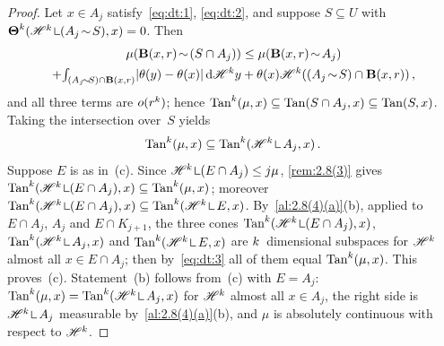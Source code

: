 \begin{proof}
    Let $x \in A_j$ satisfy~\eqref{eq:dt:1}, \eqref{eq:dt:2}, and suppose $S \subseteq U$ with
    $\density^{\vdim}(\HM^{\vdim} \restrict (A_j \without S), x) = 0$. Then
    \begin{multline*}
        \mu(\cball{x}{r} \without (S \cap A_j)) \le \mu(\cball{x}{r} \without A_j) \\
        + \textint{(A_j \without S) \cap \cball{x}{r}}{} |\theta(y) - \theta(x)| \ud \HM^{\vdim} y
        + \theta(x) \HM^{\vdim}((A_j \without S) \cap \cball{x}{r}) \,,
    \end{multline*}
    and all three terms are $o(r^{k})$; hence $\operatorname{Tan}^{k}(\mu,x) \subseteq \operatorname{Tan}(S \cap
    A_j, x) \subseteq \operatorname{Tan}(S,x)$. Taking the intersection over~$S$ yields
    \begin{equation}
        \label{eq:dt:3}
        \Tan^{\vdim}(\mu,x) \subseteq \Tan^{\vdim}(\HM^{\vdim} \restrict A_j, x) \,.
    \end{equation}
    Suppose $E$ is as in~(c). Since $\HM^{\vdim} \restrict (E \cap A_j) \le j \mu$,
    \ref{rem:2.8(3)} gives $\Tan^{\vdim}(\HM^{\vdim} \restrict (E \cap A_j), x) \subseteq
    \Tan^{\vdim}(\mu,x)$; moreover $\Tan^{\vdim}(\HM^{\vdim} \restrict (E \cap A_j), x) \subseteq
    \Tan^{\vdim}(\HM^{\vdim} \restrict E, x)$. By~\ref{al:2.8(4)(a)}(b), applied to $E \cap A_j$,
    $A_j$ and $E \cap K_{j+1}$, the three cones $\Tan^{\vdim}(\HM^{\vdim} \restrict (E \cap A_j),
    x)$, $\Tan^{\vdim}(\HM^{\vdim} \restrict A_j, x)$ and $\Tan^{\vdim}(\HM^{\vdim} \restrict E, x)$
    are $k$~dimensional subspaces for $\mathscr{H}^{k}$ almost all $x \in E \cap A_j$; then
    by~\eqref{eq:dt:3} all of them equal $\operatorname{Tan}^{k}(\mu,x)$. This proves~(c). Statement~(b)
    follows from~(c) with $E = A_j$: $\Tan^{\vdim}(\mu,x) = \Tan^{\vdim}(\HM^{\vdim} \restrict
    A_j, x)$ for $\mathscr{H}^{k}$ almost all $x \in A_j$, the right side is $\HM^{\vdim} \restrict
    A_j$ measurable by~\ref{al:2.8(4)(a)}(b), and $\mu$ is absolutely continuous with respect to
    $\mathscr{H}^{k}$.
\end{proof}

